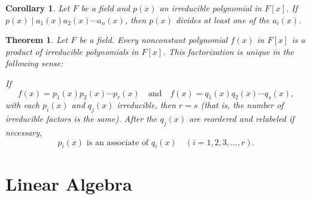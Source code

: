 \documentclass{article}
\newtheorem{theorem}{Theorem}[section]
\newtheorem{corollary}{Corollary}[section]
\theoremstyle{definition}
\theoremstyle{remark}
\begin{document}
\begin{corollary} \label{cor:irreducible polynomial divisibility}
Let $F$ be a field and $p(x)$ an irreducible polynomial in $F[x]$. If $p(x) \mid a_1(x) a_2(x) \cdots a_n(x)$, then $p(x)$ divides at least one of the $a_i(x)$.
\end{corollary}


\begin{theorem} \label{thm:unique factorization}
Let $F$ be a field. Every nonconstant polynomial $f(x)$ in $F[x]$ is a product of irreducible polynomials in $F[x]$. This factorization is unique in the following sense:

If
\[
f(x) = p_1(x) p_2(x) \cdots p_r(x) \quad \text{and} \quad f(x) = q_1(x) q_2(x) \cdots q_s(x),
\]
with each $p_i(x)$ and $q_j(x)$ irreducible, then $r = s$ (that is, the number of irreducible factors is the same). After the $q_j(x)$ are reordered and relabeled if necessary,
\[
p_i(x) \text{ is an associate of } q_i(x) \quad (i = 1, 2, 3, \dots, r).
\]
\end{theorem}






\section{Linear Algebra}
\end{document}
